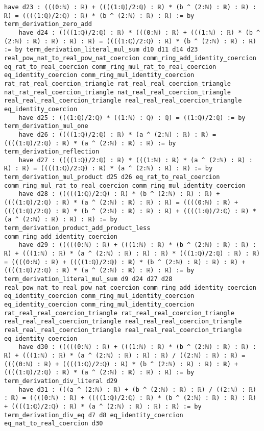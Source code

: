 \documentclass{article}
\begin{document}
\begin{tcolorbox}[colback=white!10, width=\linewidth]
\begin{lstlisting}[language=Lean4]
    have d23 : (((0:ℕ) : ℝ) + ((((1:ℚ)/2:ℚ) : ℝ) * (b ^ (2:ℕ) : ℝ) : ℝ) : ℝ) = ((((1:ℚ)/2:ℚ) : ℝ) * (b ^ (2:ℕ) : ℝ) : ℝ) := by term_derivation_zero_add
    have d24 : ((((1:ℚ)/2:ℚ) : ℝ) * (((0:ℕ) : ℝ) + (((1:ℕ) : ℝ) * (b ^ (2:ℕ) : ℝ) : ℝ) : ℝ) : ℝ) = ((((1:ℚ)/2:ℚ) : ℝ) * (b ^ (2:ℕ) : ℝ) : ℝ) := by term_derivation_literal_mul_sum d10 d11 d14 d23 real_pow_nat_to_real_pow_nat_coercion comm_ring_add_identity_coercion eq_rat_to_real_coercion comm_ring_mul_rat_to_real_coercion eq_identity_coercion comm_ring_mul_identity_coercion rat_rat_real_coercion_triangle rat_real_real_coercion_triangle nat_rat_real_coercion_triangle nat_real_real_coercion_triangle real_real_real_coercion_triangle real_real_real_coercion_triangle eq_identity_coercion
    have d25 : (((1:ℚ)/2:ℚ) * ((1:ℕ) : ℚ) : ℚ) = ((1:ℚ)/2:ℚ) := by term_derivation_mul_one
    have d26 : ((((1:ℚ)/2:ℚ) : ℝ) * (a ^ (2:ℕ) : ℝ) : ℝ) = ((((1:ℚ)/2:ℚ) : ℝ) * (a ^ (2:ℕ) : ℝ) : ℝ) := by term_derivation_reflection
    have d27 : ((((1:ℚ)/2:ℚ) : ℝ) * (((1:ℕ) : ℝ) * (a ^ (2:ℕ) : ℝ) : ℝ) : ℝ) = ((((1:ℚ)/2:ℚ) : ℝ) * (a ^ (2:ℕ) : ℝ) : ℝ) := by term_derivation_mul_product d25 d26 eq_rat_to_real_coercion comm_ring_mul_rat_to_real_coercion comm_ring_mul_identity_coercion
    have d28 : (((((1:ℚ)/2:ℚ) : ℝ) * (b ^ (2:ℕ) : ℝ) : ℝ) + ((((1:ℚ)/2:ℚ) : ℝ) * (a ^ (2:ℕ) : ℝ) : ℝ) : ℝ) = ((((0:ℕ) : ℝ) + ((((1:ℚ)/2:ℚ) : ℝ) * (b ^ (2:ℕ) : ℝ) : ℝ) : ℝ) + ((((1:ℚ)/2:ℚ) : ℝ) * (a ^ (2:ℕ) : ℝ) : ℝ) : ℝ) := by term_derivation_product_add_product_less comm_ring_add_identity_coercion
    have d29 : (((((0:ℕ) : ℝ) + (((1:ℕ) : ℝ) * (b ^ (2:ℕ) : ℝ) : ℝ) : ℝ) + (((1:ℕ) : ℝ) * (a ^ (2:ℕ) : ℝ) : ℝ) : ℝ) * (((1:ℚ)/2:ℚ) : ℝ) : ℝ) = ((((0:ℕ) : ℝ) + ((((1:ℚ)/2:ℚ) : ℝ) * (b ^ (2:ℕ) : ℝ) : ℝ) : ℝ) + ((((1:ℚ)/2:ℚ) : ℝ) * (a ^ (2:ℕ) : ℝ) : ℝ) : ℝ) := by term_derivation_literal_mul_sum d9 d24 d27 d28 real_pow_nat_to_real_pow_nat_coercion comm_ring_add_identity_coercion eq_identity_coercion comm_ring_mul_identity_coercion eq_identity_coercion comm_ring_mul_identity_coercion rat_real_real_coercion_triangle rat_real_real_coercion_triangle real_real_real_coercion_triangle real_real_real_coercion_triangle real_real_real_coercion_triangle real_real_real_coercion_triangle eq_identity_coercion
    have d30 : (((((0:ℕ) : ℝ) + (((1:ℕ) : ℝ) * (b ^ (2:ℕ) : ℝ) : ℝ) : ℝ) + (((1:ℕ) : ℝ) * (a ^ (2:ℕ) : ℝ) : ℝ) : ℝ) / ((2:ℕ) : ℝ) : ℝ) = ((((0:ℕ) : ℝ) + ((((1:ℚ)/2:ℚ) : ℝ) * (b ^ (2:ℕ) : ℝ) : ℝ) : ℝ) + ((((1:ℚ)/2:ℚ) : ℝ) * (a ^ (2:ℕ) : ℝ) : ℝ) : ℝ) := by term_derivation_div_literal d29
    have d31 : (((a ^ (2:ℕ) : ℝ) + (b ^ (2:ℕ) : ℝ) : ℝ) / ((2:ℕ) : ℝ) : ℝ) = ((((0:ℕ) : ℝ) + ((((1:ℚ)/2:ℚ) : ℝ) * (b ^ (2:ℕ) : ℝ) : ℝ) : ℝ) + ((((1:ℚ)/2:ℚ) : ℝ) * (a ^ (2:ℕ) : ℝ) : ℝ) : ℝ) := by term_derivation_div_eq d7 d8 eq_identity_coercion eq_nat_to_real_coercion d30

\end{lstlisting}
\end{tcolorbox}
\end{document}
